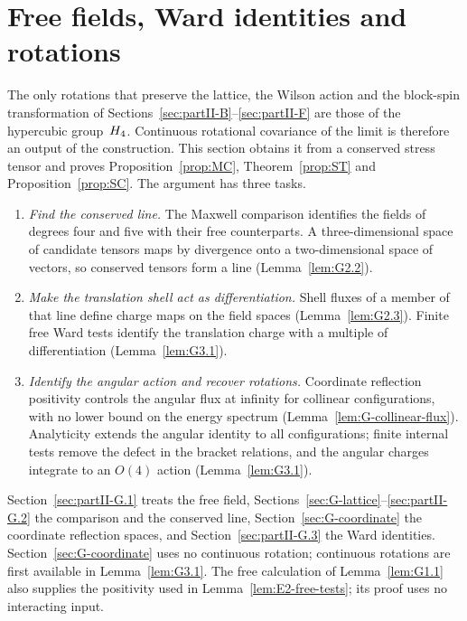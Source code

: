 \section{Free fields, Ward identities and rotations}\label{sec:partII-G}

The only rotations that preserve the lattice, the Wilson action and the block-spin transformation of Sections~\ref{sec:partII-B}--\ref{sec:partII-F} are those of the hypercubic group~$H_4$. Continuous rotational covariance of the limit is therefore an output of the construction. This section obtains it from a conserved stress tensor and proves Proposition~\ref{prop:MC}, Theorem~\ref{prop:ST} and Proposition~\ref{prop:SC}. The argument has three tasks.
\begin{enumerate}[label=(\arabic*)]
\item \emph{Find the conserved line.} The Maxwell comparison identifies the fields of degrees four and five with their free counterparts. A three-dimensional space of candidate tensors maps by divergence onto a two-dimensional space of vectors, so conserved tensors form a line (Lemma~\ref{lem:G2.2}).
\item \emph{Make the translation shell act as differentiation.} Shell fluxes of a member of that line define charge maps on the field spaces (Lemma~\ref{lem:G2.3}). Finite free Ward tests identify the translation charge with a multiple of differentiation (Lemma~\ref{lem:G3.1}).
\item \emph{Identify the angular action and recover rotations.} Coordinate reflection positivity controls the angular flux at infinity for collinear configurations, with no lower bound on the energy spectrum (Lemma~\ref{lem:G-collinear-flux}). Analyticity extends the angular identity to all configurations; finite internal tests remove the defect in the bracket relations, and the angular charges integrate to an $O(4)$ action (Lemma~\ref{lem:G3.1}).
\end{enumerate}
Section~\ref{sec:partII-G.1} treats the free field, Sections~\ref{sec:G-lattice}--\ref{sec:partII-G.2} the comparison and the conserved line, Section~\ref{sec:G-coordinate} the coordinate reflection spaces, and Section~\ref{sec:partII-G.3} the Ward identities. Section~\ref{sec:G-coordinate} uses no continuous rotation; continuous rotations are first available in Lemma~\ref{lem:G3.1}. The free calculation of Lemma~\ref{lem:G1.1} also supplies the positivity used in Lemma~\ref{lem:E2-free-tests}; its proof uses no interacting input.

